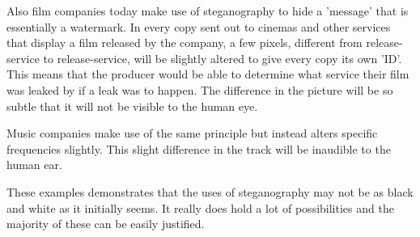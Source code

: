 Also film companies today make use of steganography to hide a 'message' that is essentially a watermark.
In every copy sent out to cinemas and other services that display a film released by the company, a few pixels, different from release-service to release-service, will be slightly altered to give every copy its own 'ID'.
This means that the producer would be able to determine what service their film was leaked by if a leak was to happen.
The difference in the picture will be so subtle that it will not be visible to the human eye.

Music companies make use of the same principle but instead alters specific frequencies slightly.
This slight difference in the track will be inaudible to the human ear. \cite{Anderson1998}

These examples demonstrates that the uses of steganography may not be as black and white as it initially seems.
It really does hold a lot of possibilities and the majority of these can be easily justified.

